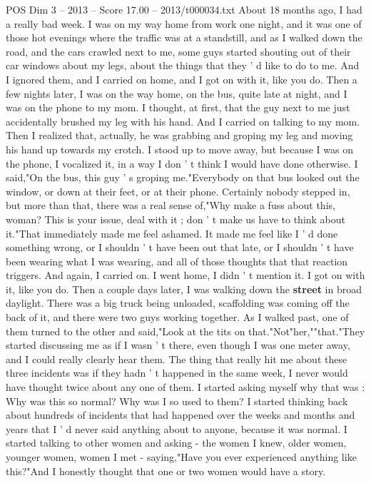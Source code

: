 \begin{textsample}{POS Dim 3 – 2013 – Score 17.00 – 2013/t000034.txt}  \label{ex:f3_pos_050}
About 18 months ago, I had a really bad week.
I was on my way home from work one night, and it was one of those hot evenings where the traffic was at a standstill, and as I walked down the road, and the cars crawled next to me, some guys started shouting out of their car windows about my legs, about the things that they ' d like to do to me.
And I ignored them, and I carried on home, and I got on with it, like you do.
Then a few nights later, I was on the way home, on the bus, quite late at night, and I was on the phone to my mom.
I thought, at first, that the guy next to me just accidentally brushed my leg with his hand.
And I carried on talking to my mom.
Then I realized that, actually, he was grabbing and groping my leg and moving his hand up towards my crotch.
I stood up to move away, but because I was on the phone, I vocalized it, in a way I don ' t think I would have done otherwise.
I said,"On the bus, this guy ' s groping me."Everybody on that bus looked out the window, or down at their feet, or at their phone.
Certainly nobody stepped in, but more than that, there was a real sense of,"Why make a fuss about this, woman?
This is your issue, deal with it ; don ' t make us have to think about it."That immediately made me feel ashamed.
It made me feel like I ' d done something wrong, or I shouldn ' t have been out that late, or I shouldn ' t have been wearing what I was wearing, and all of those thoughts that that reaction triggers.
And again, I carried on.
I went home, I didn ' t mention it.
I got on with it, like you do.
Then a couple days later, I was walking down the \textbf{street} in broad daylight.
There was a big truck being unloaded, scaffolding was coming off the back of it, and there were two guys working together.
As I walked past, one of them turned to the other and said,"Look at the tits on that."Not"her,""that."They started discussing me as if I wasn ' t there, even though I was one meter away, and I could really clearly hear them.
The thing that really hit me about these three incidents was if they hadn ' t happened in the same week, I never would have thought twice about any one of them.
I started asking myself why that was : Why was this so normal?
Why was I so used to them?
I started thinking back about hundreds of incidents that had happened over the weeks and months and years that I ' d never said anything about to anyone, because it was normal.
I started talking to other women and asking - the women I knew, older women, younger women, women I met - saying,"Have you ever experienced anything like this?"And I honestly thought that one or two women would have a story.

\end{textsample}
